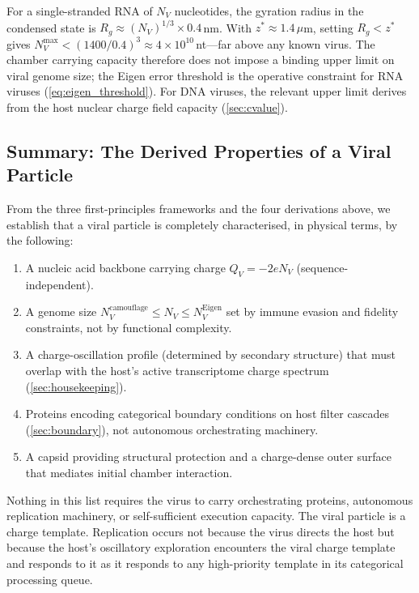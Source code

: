\documentclass[11pt,twocolumn,a4paper]{article}
\theoremstyle{definition}
\theoremstyle{remark}
\newcommand{\zstar}{z^{*}}
\begin{document}
For a single-stranded RNA of $N_V$ nucleotides, the gyration radius in the condensed state is $R_g \approx (N_V)^{1/3} \times 0.4$\,nm. With $\zstar \approx 1.4\,\mu$m, setting $R_g < \zstar$ gives $N_V^{\max} < (1400/0.4)^3 \approx 4 \times 10^{10}$\,nt---far above any known virus. The chamber carrying capacity therefore does not impose a binding upper limit on viral genome size; the Eigen error threshold is the operative constraint for RNA viruses (\cref{eq:eigen_threshold}). For DNA viruses, the relevant upper limit derives from the host nuclear charge field capacity (\cref{sec:cvalue}).

\subsection{Summary: The Derived Properties of a Viral Particle}

From the three first-principles frameworks and the four derivations above, we establish that a viral particle is completely characterised, in physical terms, by the following:

\begin{enumerate}[(1)]
  \item A nucleic acid backbone carrying charge $Q_V = -2e N_V$ (sequence-independent).
  \item A genome size $N_V^{\mathrm{camouflage}} \leq N_V \leq N_V^{\mathrm{Eigen}}$ set by immune evasion and fidelity constraints, not by functional complexity.
  \item A charge-oscillation profile (determined by secondary structure) that must overlap with the host's active transcriptome charge spectrum (\cref{sec:housekeeping}).
  \item Proteins encoding categorical boundary conditions on host filter cascades (\cref{sec:boundary}), not autonomous orchestrating machinery.
  \item A capsid providing structural protection and a charge-dense outer surface that mediates initial chamber interaction.
\end{enumerate}

Nothing in this list requires the virus to carry orchestrating proteins, autonomous replication machinery, or self-sufficient execution capacity. The viral particle is a charge template. Replication occurs not because the virus directs the host but because the host's oscillatory exploration encounters the viral charge template and responds to it as it responds to any high-priority template in its categorical processing queue.
\end{document}
